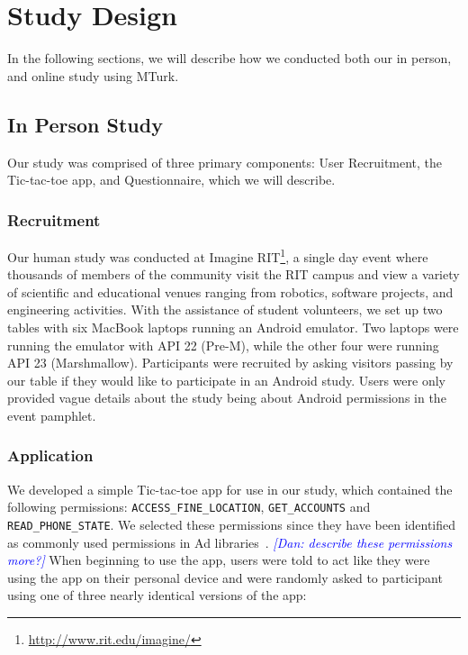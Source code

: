 \documentclass{sig-alternate-05-2015}
\newcommand{\dan}[1]{\textcolor{blue}{{\it [Dan: #1]}}}
\begin{document}





\section{Study Design}
\label{sec:studyDesign}

In the following sections, we will describe how we conducted both our in person, and online study using MTurk.

\subsection{In Person Study} %
Our study was comprised of three primary components: User Recruitment, the Tic-tac-toe app, and Questionnaire, which we will describe.

\subsubsection{Recruitment}

Our human study was conducted at Imagine RIT\footnote{\url{http://www.rit.edu/imagine/}}, a single day event where thousands of members of the community visit the RIT campus and view a variety of scientific and educational venues ranging from robotics, software projects, and engineering activities. With the assistance of student volunteers, we set up two tables with six MacBook laptops running an Android emulator. Two laptops were running the emulator with API 22 (Pre-M), while the other four were running API 23 (Marshmallow). Participants were recruited by asking visitors passing by our table if they would like to participate in an Android study. Users were only provided vague details about the study being about Android permissions in the event pamphlet.

\subsubsection{Application}

We developed a simple Tic-tac-toe app for use in our study, which
contained the following permissions: \texttt{ACCESS\_FINE\_LOCATION},
\texttt{GET\_ACCOUNTS} and \texttt{READ\_PHONE\_STATE}. We selected
these permissions since they have been identified as commonly used
permissions in Ad libraries~\cite{liu2015efficient}. \dan{describe these permissions more?}  When beginning
to use the app, users were told to act like they were using the app on
their personal device and were randomly asked to participant using one
of three nearly identical versions of the app:
\end{document}
